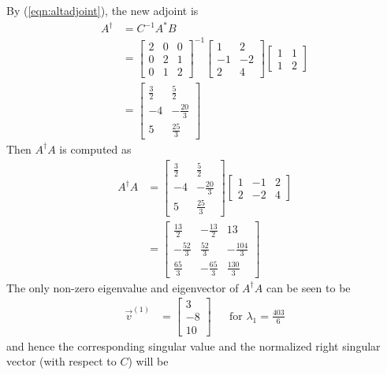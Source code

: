 \begin{solution}
By (\ref{eqn:altadjoint}), the new adjoint is
\begin{align*}
A^\dag &= C^{-1} A^* B \\
&= \begin{bmatrix}
2 & 0 & 0 \\
0 & 2 & 1 \\
0 & 1 & 2
\end{bmatrix}^{-1}
\begin{bmatrix}
1 & 2 \\
-1 & -2 \\
2 & 4
\end{bmatrix} 
\begin{bmatrix}
1 & 1 \\
1 & 2
\end{bmatrix} \\
&=
\begin{bmatrix}
\frac{3}{2} & \frac{5}{2}\\ 
-4 & -\frac{20}{3}\\ 
5 & \frac{25}{3}
\end{bmatrix}
\end{align*}
Then $A^\dag A$ is computed as
\begin{align*}
A^\dag A &= \begin{bmatrix}
\frac{3}{2} & \frac{5}{2}\\ 
-4 & -\frac{20}{3}\\ 
5 & \frac{25}{3}
\end{bmatrix}
\begin{bmatrix}
1 & -1 & 2 \\
2 & -2 & 4
\end{bmatrix} \\
&= \begin{bmatrix}
\frac{13}{2} & -\frac{13}{2} & 13\\ 
-\frac{52}{3} & \frac{52}{3} & -\frac{104}{3}\\ 
\frac{65}{3} & -\frac{65}{3} & \frac{130}{3}
\end{bmatrix}
\end{align*}
The only non-zero eigenvalue and eigenvector of $A^\dag A$ can be seen to be
\begin{align*} \vec{v}^{(1)} &=
\begin{bmatrix}
3\\ 
-8\\ 
10
\end{bmatrix} & & \text {for $\lambda_1 = \frac{403}{6}$}
\end{align*}
and hence the corresponding singular value and the normalized right singular vector (with respect to $C$) will be

\end{solution}
